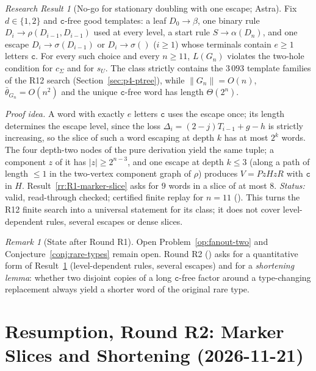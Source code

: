 \documentclass[11pt]{article}
\numberwithin{equation}{section}
\theoremstyle{plain}
\theoremstyle{definition}
\theoremstyle{remark}
\newtheorem{remark}[theorem]{Remark}
\newtheorem{rresult}[theorem]{Research Result}
\theoremstyle{plain}
\begin{document}
\begin{rresult}[No-go for stationary doubling with one escape; Astra]
\label{rr:R1-nogo}
Fix $d\in\{1,2\}$ and $\mathtt c$-free good templates: a leaf $D_0\to\beta$, one binary
rule $D_i\to\rho(D_{i-1},D_{i-1})$ used at every level, a start rule $S\to\alpha(D_n)$,
and one escape $D_i\to\sigma(D_{i-1})$ or $D_i\to\sigma()$ ($i\ge1$) whose terminals
contain $e\ge1$ letters $\mathtt c$.  For every such choice and every $n\ge11$, $L(G_n)$
violates the two-hole condition for $c_\Sigma$ and for $s_U$.  The class strictly
contains the $3\,093$ template families of the R12 search
(Section~\ref{sec:p4-ptree}), while $\|G_n\|=O(n)$, $\bar\theta_{G_n}=O(n^2)$ and the
unique $\mathtt c$-free word has length $\Theta(2^n)$.
\end{rresult}
\noindent\emph{Proof idea.} A word with exactly $e$ letters $\mathtt c$ uses the escape
once; its length determines the escape level, since the loss
$\Delta_i=(2-j)T_{i-1}+g-h$ is strictly increasing, so the slice of such a word escaping
at depth $k$ has at most $2^k$ words.  The four depth-two nodes of the pure derivation
yield the same tuple; a component $z$ of it has $|z|\ge2^{n-3}$, and one escape at
depth $k\le3$ (along a path of length $\le1$ in the two-vertex component graph of
$\rho$) produces $V=PzHzR$ with $\mathtt c$ in $H$.  Result~\ref{rr:R1-marker-slice}
asks for $9$ words in a slice of at most $8$.  \emph{Status:} valid, read-through
checked; certified finite replay for $n=11$ ().  This turns the R12
finite search into a universal statement for its class; it does not cover
level-dependent rules, several escapes or dense slices.

\begin{remark}[State after Round R1]
\label{rem:R1-state}
Open Problem~\ref{op:fanout-two} and Conjecture~\ref{conj:rare-types} remain open.
Round R2 () asks for a quantitative
form of Result~\ref{rr:R1-nogo} (level-dependent rules, several escapes) and for a
\emph{shortening lemma}: whether two disjoint copies of a long $\mathtt c$-free factor
around a type-changing replacement always yield a shorter word of the original rare
type.
\end{remark}

\section{Resumption, Round R2: Marker Slices and Shortening (2026-11-21)}
\label{sec:p4-resume-R2}
\end{document}

